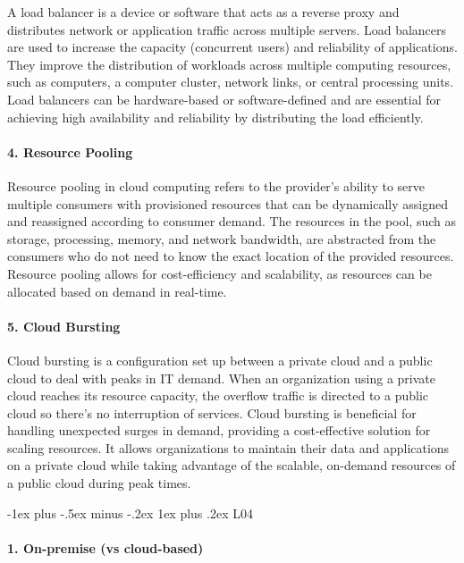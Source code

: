 \documentclass[10pt, landscape]{article}
\makeatletter
\renewcommand{\subsubsection}{\@startsection{subsubsection}{3}{0mm}%
  {-1ex plus -.5ex minus -.2ex}%
  {1ex plus .2ex}%
{\normalfont\small\bfseries}}%
\makeatother
\begin{document}
\begin{multicols*}{4}
A load balancer is a device or software that acts as a reverse proxy and
distributes network or application traffic across multiple servers. Load
balancers are used to increase the capacity (concurrent users) and
reliability of applications. They improve the distribution of workloads
across multiple computing resources, such as computers, a computer
cluster, network links, or central processing units. Load balancers can
be hardware-based or software-defined and are essential for achieving
high availability and reliability by distributing the load efficiently.

\paragraph{4. Resource Pooling}\label{resource-pooling-1}

Resource pooling in cloud computing refers to the provider's ability to
serve multiple consumers with provisioned resources that can be
dynamically assigned and reassigned according to consumer demand. The
resources in the pool, such as storage, processing, memory, and network
bandwidth, are abstracted from the consumers who do not need to know the
exact location of the provided resources. Resource pooling allows for
cost-efficiency and scalability, as resources can be allocated based on
demand in real-time.

\paragraph{5. Cloud Bursting}\label{cloud-bursting-1}

Cloud bursting is a configuration set up between a private cloud and a
public cloud to deal with peaks in IT demand. When an organization using
a private cloud reaches its resource capacity, the overflow traffic is
directed to a public cloud so there's no interruption of services. Cloud
bursting is beneficial for handling unexpected surges in demand,
providing a cost-effective solution for scaling resources. It allows
organizations to maintain their data and applications on a private cloud
while taking advantage of the scalable, on-demand resources of a public
cloud during peak times.

\subsubsection{L04}\label{l04}

\paragraph{1. On-premise (vs
cloud-based)}\label{on-premise-vs-cloud-based}


\end{multicols*}
\end{document}
